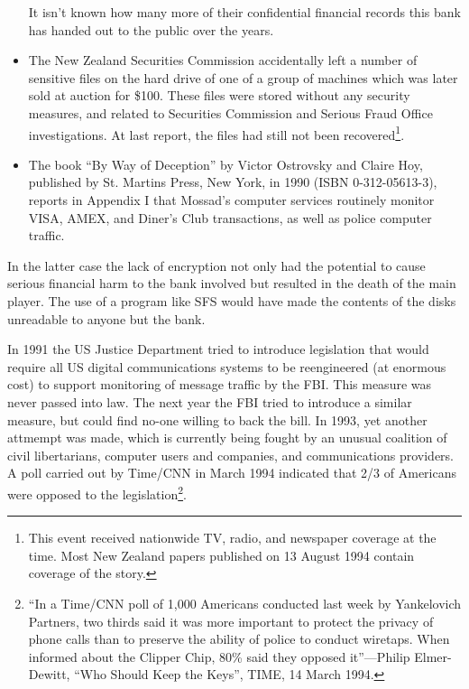 \begin{itemize}
      It isn't known how many more of their confidential financial records this
      bank has handed out to the public over the years.

\item The New Zealand Securities Commission accidentally left a number of
      sensitive files on the hard drive of one of a group of machines which was
      later sold at auction for \$100.  These files were stored without any
      security measures, and related to Securities Commission and Serious Fraud
      Office investigations.  At last report, the files had still not been
      recovered\footnote{
                This event received nationwide TV, radio, and newspaper coverage
                at the time.  Most New Zealand papers published on 13 August
                1994 contain coverage of the story.
}.

\item The book ``By Way of Deception'' by Victor Ostrovsky and Claire Hoy,
      published by St. Martins Press, New York, in 1990 (ISBN 0-312-05613-3),
      reports in Appendix I that Mossad's computer services routinely monitor
      VISA, AMEX, and Diner's Club transactions, as well as police computer
      traffic.

\end{itemize}

In the latter case the lack of encryption not only had the potential to cause
serious financial harm to the bank involved but resulted in the death of the
main player.  The use of a program like SFS would have made the contents of the
disks unreadable to anyone but the bank.

In 1991 the US Justice Department tried to introduce legislation that would
require all US digital communications systems to be reengineered (at enormous
cost) to support monitoring of message traffic by the FBI.  This measure was
never passed into law.  The next year the FBI tried to introduce a similar
measure, but could find no-one willing to back the bill.  In 1993, yet another
attmempt was made, which is currently being fought by an unusual coalition of
civil libertarians, computer users and companies, and communications providers.
A poll carried out by Time/CNN in March 1994 indicated that 2/3 of Americans
were opposed to the legislation\footnote{
\edef\@currentlabel{\csname p@footnote\endcsname\csname thefootnote\endcsname}
\label{footnote12}
		``In a Time/CNN poll of 1,000 Americans conducted last week by
               	Yankelovich Partners, two thirds said it was more important to
               	protect the privacy of phone calls than to preserve the ability
               	of police to conduct wiretaps.  When informed about the Clipper
               	Chip, 80\% said they opposed it''---Philip Elmer-Dewitt, ``Who
               	Should Keep the Keys'', TIME, 14 March 1994.
}.

